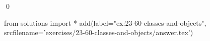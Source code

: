 
\begin{ex}
  \label{ex:23-60-classes-and-objects}
  
  \qed
\end{ex}
\begin{python0}
from solutions import *
add(label="ex:23-60-classes-and-objects",
    srcfilename='exercises/23-60-classes-and-objects/answer.tex')
\end{python0}
